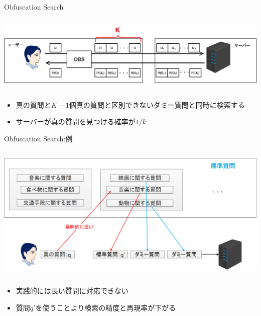 \documentclass[14pt,xcolor=dvipsnames,table,dvipdfmx]{beamer}
\begin{document}
\begin{frame}{Obfuscation Search}
    \begin{columns}[t]
        \begin{column}{1\textwidth} %
            \includegraphics[width=\columnwidth]{rk4.png}
		\end{column}
    \end{columns}
	\begin{block}{} 
		\begin{itemize}
			\item 真の質問と$K-1$個真の質問と区別できないダミー質問と同時に検索する
			\item サーバーが真の質問を見つける確率が$1/k$
		\end{itemize}
	\end{block}
\end{frame}

\begin{frame}{Obfuscation Search:例}
    \begin{columns}[t]
        \begin{column}{1\textwidth} %
            \includegraphics[width=\columnwidth]{rk14.png}
		\end{column}
    \end{columns}
	\begin{block}{} 
		\begin{itemize}
			\item 実践的には長い質問に対応できない
			\item 質問$q'$を使うことより検索の精度と再現率が下がる
		\end{itemize}
	\end{block}
\end{frame}
\end{document}
